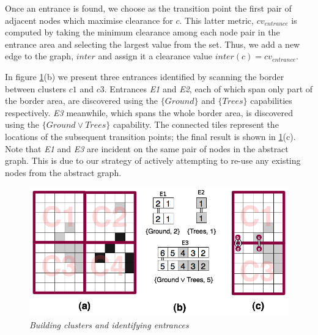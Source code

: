 {\par \indent
Once an entrance is found, we choose as the transition point the first pair of adjacent nodes which maximise clearance for $c$. 
This latter metric, $cv_{entrance}$ is computed by taking the minimum clearance among each node pair in the entrance area and selecting the largest value from the set. 
Thus, we add a new edge to the graph, $inter$ and assign it a clearance value $inter(c) = cv_{entrance}$. 
\par \indent
In figure \ref{aha-fig:clustersandentrances}(b) we present three entrances identified by scanning the border between clusters $c1$ and $c3$.
Entrances \emph{E1} and \emph{E2}, each of which span only part of the border area, are discovered using the $\lbrace Ground \rbrace$ and $\lbrace Trees \rbrace$ capabilities respectively. 
\emph{E3} meanwhile, which spans the whole border area, is discovered using the $\lbrace Ground \vee Trees \rbrace$ capability. 
The connected tiles represent the locations of the subsequent transition points; the final result is shown in \ref{aha-fig:clustersandentrances}(c). 
Note that \emph{E1} and \emph{E3} are incident on the same pair of nodes in the abstract graph. This is due to our  strategy of actively attempting to re-use any existing nodes from the abstract graph. 

\begin{figure}[htbp]
        \caption{\emph{Building clusters and identifying entrances} }
        \begin{center}
                        \includegraphics[scale=0.25]{diagrams/identifying_entrances.png}
        \end{center}
        \label{aha-fig:clustersandentrances}
\end{figure}

}

